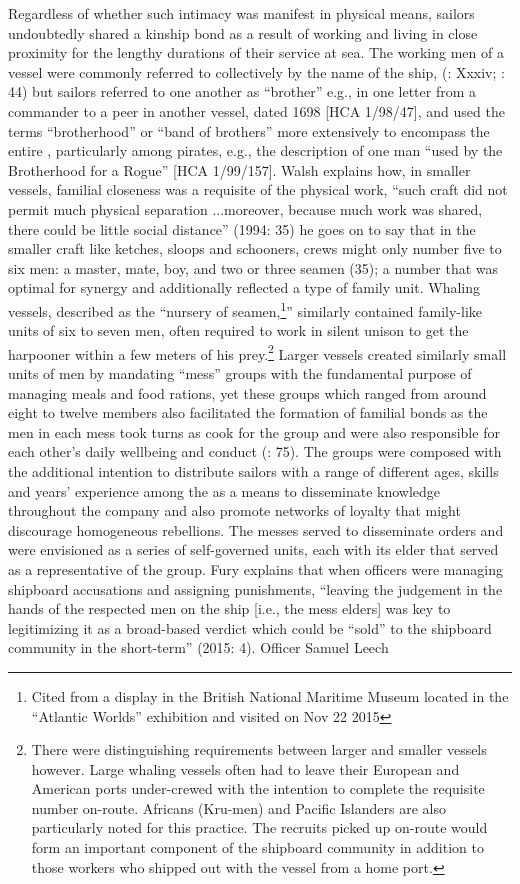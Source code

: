 Regardless of whether such intimacy was manifest in physical means, sailors undoubtedly shared a kinship bond as a result of working and living in close proximity for the lengthy durations of their service at sea. The working men of a vessel were commonly referred to collectively by the name of the ship, (\citealt{AdkinsAdkins2008}: Xxxiv; \citealt{Palmer1986}: 44) but sailors referred to one another as “brother” e.g., in one letter from a commander to a peer in another vessel, dated 1698 [HCA 1/98/47], and used the terms “brotherhood” or “band of brothers” more extensively to encompass the entire , particularly among pirates, e.g., the description of one man “used by the Brotherhood for a Rogue” [HCA 1/99/157]. Walsh explains how, in smaller vessels, familial closeness was a requisite of the physical work, “such craft did not permit much physical separation ...moreover, because much work was shared, there could be little social distance” (1994: 35) he goes on to say that in the smaller craft like ketches, sloops and schooners, crews might only number five to six men: a master, mate, boy, and two or three seamen (35); a number that was optimal for synergy and additionally reflected a type of family unit. Whaling vessels, described as the “nursery of seamen,\footnote{Cited from a display in the British National Maritime Museum located in the “Atlantic Worlds” exhibition and visited on Nov 22 2015}” similarly contained family-like units of six to seven men, often required to work in silent unison to get the harpooner within a few meters of his prey.\footnote{There were distinguishing  requirements between larger and smaller vessels however. Large whaling vessels often had to leave their European and American ports under-crewed with the intention to complete the requisite  number on-route. Africans (Kru-men) and Pacific Islanders are also particularly noted for this practice. The recruits picked up on-route would form an important component of the shipboard community in addition to those workers who shipped out with the vessel from a home port.}  Larger vessels created similarly small units of men by mandating “mess” groups with the fundamental purpose of managing meals and food rations, yet these groups which ranged from around eight to twelve members also facilitated the formation of familial bonds as the men in each mess took turns as cook for the group and were also responsible for each other’s daily wellbeing and conduct (\citealt{AdkinsAdkins2008}: 75). The groups were composed with the additional intention to distribute sailors with a range of different ages, skills and years’ experience among the  as a means to disseminate knowledge throughout the company and also promote networks of loyalty that might discourage homogeneous rebellions. The messes served to disseminate orders and were envisioned as a series of self-governed units, each with its elder that served as a representative of the group. Fury explains that when officers were managing shipboard accusations and assigning punishments, “leaving the judgement in the hands of the respected men on the ship [i.e., the mess elders] was key to legitimizing it as a broad-based verdict which could be “sold” to the shipboard community in the short-term” (2015: 4). Officer Samuel Leech 